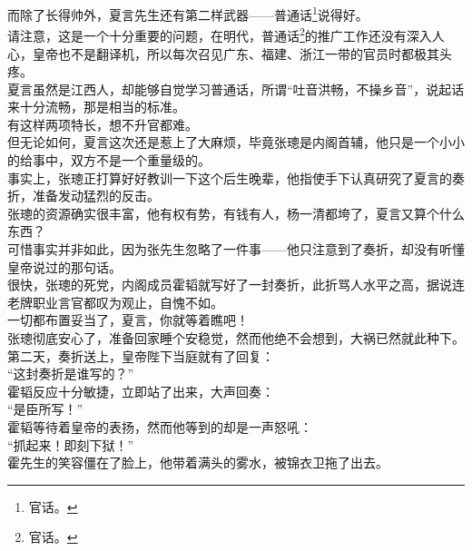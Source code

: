 \begin{multicols}{\theparacolNo}
而除了长得帅外，夏言先生还有第二样武器——普通话\footnote{官话。}说得好。\\

请注意，这是一个十分重要的问题，在明代，普通话\footnote{官话。}的推广工作还没有深入人心，皇帝也不是翻译机，所以每次召见广东、福建、浙江一带的官员时都极其头疼。\\

夏言虽然是江西人，却能够自觉学习普通话，所谓“吐音洪畅，不操乡音”，说起话来十分流畅，那是相当的标准。\\

有这样两项特长，想不升官都难。\\

但无论如何，夏言这次还是惹上了大麻烦，毕竟张璁是内阁首辅，他只是一个小小的给事中，双方不是一个重量级的。\\

事实上，张璁正打算好好教训一下这个后生晚辈，他指使手下认真研究了夏言的奏折，准备发动猛烈的反击。\\

张璁的资源确实很丰富，他有权有势，有钱有人，杨一清都垮了，夏言又算个什么东西？\\

可惜事实并非如此，因为张先生忽略了一件事——他只注意到了奏折，却没有听懂皇帝说过的那句话。\\

很快，张璁的死党，内阁成员霍韬就写好了一封奏折，此折骂人水平之高，据说连老牌职业言官都叹为观止，自愧不如。\\

一切都布置妥当了，夏言，你就等着瞧吧！\\

张璁彻底安心了，准备回家睡个安稳觉，然而他绝不会想到，大祸已然就此种下。\\

第二天，奏折送上，皇帝陛下当庭就有了回复：\\

“这封奏折是谁写的？”\\

霍韬反应十分敏捷，立即站了出来，大声回奏：\\

“是臣所写！”\\

霍韬等待着皇帝的表扬，然而他等到的却是一声怒吼：\\

“抓起来！即刻下狱！”\\

霍先生的笑容僵在了脸上，他带着满头的雾水，被锦衣卫拖了出去。\\


\end{multicols}
